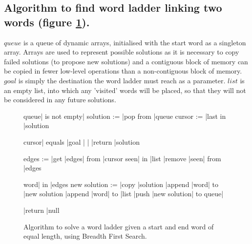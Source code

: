 \documentclass[11pt]{article} %
\begin{document}
\subsection{Algorithm to find word ladder linking two words (figure \ref{fig:DiscoverAlgorithm}).}
$queue$ is a queue of dynamic arrays, initialised with the start word as a singleton array. Arrays are used to represent possible solutions as it is necessary to copy failed solutions (to propose new solutions) and a contiguous block of memory can be copied in fewer low-level operations than a non-contiguous block of memory. $goal$ is simply the destination the word ladder must reach as a parameter. $list$ is an empty list, into which any 'visited' words will be placed, so that they will not be considered in any future solutions.


\begin{figure}[h!!]
\caption{Algorithm to solve a word ladder given a start and end word of equal length, using Breadth First Search.}
\begin{program}
\BEGIN
\WHILE queue| is not empty|\DO
	solution := |pop from |queue 
	cursor := |last in |solution

	\IF cursor| equals |goal | |\THEN
		|return |solution 
	\FI
	
	edges := |get |edges| from |cursor
	\FOR seen| in |list \DO
		|remove |seen| from |edges 
	\OD

	\FOR word| in |edges \DO
		new solution := |copy |solution 
		|append |word| to |new solution
		|append |word| to |list 
		|push |new solution| to queue| 
	\OD

	|return |null 
\OD
\END
\end{program}
\label{fig:DiscoverAlgorithm}
\end{figure}
\end{document}
